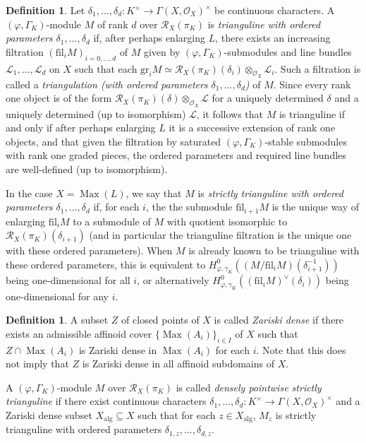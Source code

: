 \documentclass[12pt]{article}
\theoremstyle{definition}
\newtheorem{defn}[theorem]{Definition}
\numberwithin{equation}{theorem}
\newcommand{\calL}{\mathcal{L}}
\newcommand{\calO}{\mathcal{O}}
\newcommand{\calR}{\mathcal{R}}
\newcommand{\alg}{\mathrm{alg}}
\newcommand{\fil}{\mathrm{fil}}
\newcommand{\gr}{\mathrm{gr}}
\DeclareMathOperator{\Max}{Max}
\begin{document}
\begin{defn}
\label{D:strictly triangular}
Let $\delta_1,\ldots,\delta_d: K^\times \to \Gamma(X, \calO_X)^\times$
be continuous characters.  A $(\varphi, \Gamma_K)$-module $M$ of rank
$d$ over $\calR_X(\pi_K)$ is \emph{trianguline with ordered parameters
  $\delta_1, \dots, \delta_d$} if, after perhaps enlarging $L$, there
exists an increasing filtration $(\fil_i M)_{i=0, \dots, d}$ of $M$
given by $(\varphi, \Gamma_K)$-submodules and line bundles
$\calL_1,\ldots,\calL_d$ on $X$ such that each $\gr_iM \simeq
\calR_X(\pi_K)(\delta_i) \otimes_{\calO_X} \calL_i$.  Such a
filtration is called a \emph{triangulation (with ordered parameters
  $\delta_1, \dots, \delta_d$)} of $M$.  Since every rank one object
is of the form $\calR_X(\pi_K)(\delta) \otimes_{\calO_X} \calL$ for a
uniquely determined $\delta$ and a uniquely determined (up to
isomorphism) $\calL$, it follows that $M$ is trianguline if and only
if after perhaps enlarging $L$ it is a successive extension of rank
one objects, and that given the filtration by saturated
$(\varphi,\Gamma_K)$-stable submodules with rank one graded pieces,
the ordered parameters and required line bundles are well-defined (up
to isomorphism).

In the case $X = \Max(L)$, we say that $M$ is \emph{strictly
  trianguline with ordered parameters $\delta_1, \dots, \delta_d$} if,
for each $i$, the the submodule $\fil_{i+1}M$ is the unique way of
enlarging $\fil_iM$ to a submodule of $M$ with quotient isomorphic to
$\calR_X(\pi_K)(\delta_{i+1})$ (and in particular the trianguline
filtration is the unique one with these ordered parameters).  When $M$
is already known to be trianguline with these ordered parameters, this
is equivalent to $H^0_{\varphi,
  \gamma_K}((M/\fil_iM)(\delta_{i+1}^{-1}))$ being one-dimensional for
all $i$, or alternatively $H^0_{\varphi,
  \gamma_K}((\fil_iM)^\vee(\delta_i))$ being one-dimensional for any
$i$.
\end{defn}



\begin{defn}
A subset $Z$ of closed points of $X$ is called \emph{Zariski dense} if there exists an admissible affinoid cover $\{\Max(A_i)\}_{i \in I}$ of $X$ such that $Z \cap \Max(A_i)$ is Zariski dense in $\Max(A_i)$ for each $i$.
Note that this does not imply that $Z$ is Zariski dense in all affinoid subdomains of $X$.

A $(\varphi, \Gamma_K)$-module $M$ over $\calR_X(\pi_K)$ is called \emph{densely pointwise strictly trianguline}  if there exist continuous characters $\delta_1, \dots, \delta_d: K^\times \to \Gamma(X, \calO_X)^\times$ and  a Zariski dense subset $X_\alg \subseteq X$ such that for each $z \in X_\alg$, $M_z$ is strictly trianguline with ordered parameters $\delta_{1,z}, \dots, \delta_{d,z}$.
\end{defn}
\end{document}
